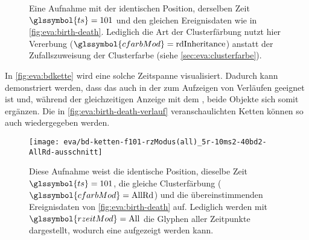 \begin{figure}
	{\caption{Eine Aufnahme mit der identischen Position, derselben Zeit $\glssymbol{ts} = 101$ und den gleichen Ereignisdaten wie in \autoref{fig:eva:birth-death}. Lediglich die Art der Clusterfärbung nutzt hier Vererbung ($\glssymbol{cfarbMod} = \text{rdInheritance}$) anstatt der Zufallszuweisung der Clusterfarbe (siehe \autoref{sec:eva:clusterfarbe}).}\label{fig:eva:birth-death-flow:beweis}}
\end{figure}

In \autoref{fig:eva:bdkette} wird eine solche Zeitspanne visualisiert. Dadurch kann demonstriert werden, dass das  auch in der  zum Aufzeigen von Verläufen geeignet ist und, während der gleichzeitigen Anzeige mit dem , beide Objekte sich somit ergänzen. Die in \autoref{fig:eva:birth-death-verlauf} veranschaulichten Ketten können so auch  wiedergegeben werden.

\begin{figure}
	\texttt{[image: eva/bd-ketten-f101-rzModus(all)\_5r-10ms2-40bd2-AllRd-ausschnitt]}
	\caption{Diese Aufnahme weist die identische Position, dieselbe Zeit $\glssymbol{ts} = 101$, die gleiche Clusterfärbung ($\glssymbol{cfarbMod} = \text{AllRd}$) und die übereinstimmenden Ereignisdaten von \autoref{fig:eva:birth-death} auf. Lediglich werden mit $\glssymbol{rzeitMod} = \text{All}$ die Glyphen aller Zeitpunkte dargestellt, wodurch eine  aufgezeigt werden kann.}\label{fig:eva:bdkette}
\end{figure}

